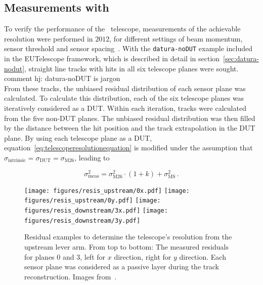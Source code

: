 \subsection{Measurements with \Datura}

To verify the performance of the \Datura~telescope, measurements of the achievable resolution were performed in $2012$, for different settings of beam momentum,
 sensor threshold and sensor spacing~\cite{ref:thomas}.
With the \texttt{datura-noDUT} example included in the {EUTelescope} framework, which is described in detail in section~\ref{sec:datura-nodut},
 straight line tracks with hits in all six telescope planes were sought. 
 \\{comment hj: datura-noDUT is jargon}\\
From these tracks, the unbiased residual distribution of each sensor plane was calculated.
To calculate this distribution, each of the six telescope planes was iteratively considered as a DUT.
Within each iteration, tracks were calculated from the five non-DUT planes.
The unbiased residual distribution was then filled by the distance between the hit position and the track extrapolation in the DUT plane.
By using each telescope plane as a DUT, equation~\ref{eq:telescoperesolutionequation} is modified under the assumption that $\sigma_{\textrm{intrinsic}} = \sigma_{\textrm{DUT}} = \sigma_{\textrm{M26}}$,
 leading to

\begin{equation}
\label{eq:telescoperesolutionequation_2}
\sigma_{\textrm{meas}}^2 = \sigma_{\textrm{M26}}^2 \cdot \left( 1 + k \right) +
\sigma_{\textrm{MS}}^2\,.
\end{equation}

\begin{figure}[tb]
  \centering
  \texttt{[image: figures/resis\_upstream/0x.pdf]}
  \texttt{[image: figures/resis\_upstream/0y.pdf]}
  \texttt{[image: figures/resis\_downstream/3x.pdf]}
  \texttt{[image: figures/resis\_downstream/3y.pdf]}
  \caption[Residual examples to determine the \Datura telescope's resolution~\cite{ref:thomas}]{Residual examples to determine the \Datura telescope's resolution from the upstream lever arm.
From top to bottom: The measured residuals for planes $0$ and $3$, left for $x$ direction, right for $y$ direction.
Each sensor plane was considered as a passive layer during the track reconstruction. Images from~\cite{ref:thomas}.}
  \label{fig:residualexample1}
\end{figure}

